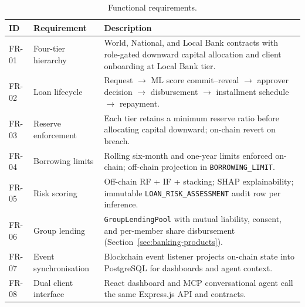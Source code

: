 \documentclass[12pt,a4paper]{report}
\newcommand{\tableheadcolor}{\rowcolor{TableHeadBg}}
\begin{document}
\begin{table}[H]
\centering
\caption[Functional requirements]{Functional requirements.}
\label{tab:functional-requirements}
\small
\begin{tabular}{@{}p{1.2cm}p{4.2cm}p{8.8cm}@{}}
\toprule
\tableheadcolor
\textbf{ID} & \textbf{Requirement} & \textbf{Description} \\
\midrule
FR-01 & Four-tier hierarchy & World, National, and Local Bank contracts with role-gated downward capital allocation and client onboarding at Local Bank tier. \\
FR-02 & Loan lifecycle & Request $\to$ ML score commit--reveal $\to$ approver decision $\to$ disbursement $\to$ installment schedule $\to$ repayment. \\
FR-03 & Reserve enforcement & Each tier retains a minimum reserve ratio before allocating capital downward; on-chain revert on breach. \\
FR-04 & Borrowing limits & Rolling six-month and one-year limits enforced on-chain; off-chain projection in \texttt{BORROWING\_LIMIT}. \\
FR-05 & Risk scoring & Off-chain RF + IF + stacking; SHAP explainability; immutable \texttt{LOAN\_RISK\_ASSESSMENT} audit row per inference. \\
FR-06 & Group lending & \texttt{GroupLendingPool} with mutual liability, consent, and per-member share disbursement (Section~\ref{sec:banking-products}). \\
FR-07 & Event synchronisation & Blockchain event listener projects on-chain state into PostgreSQL for dashboards and agent context. \\
FR-08 & Dual client interface & React dashboard and MCP conversational agent call the same Express.js API and contracts. \\
\bottomrule
\end{tabular}
\end{table}
\end{document}
